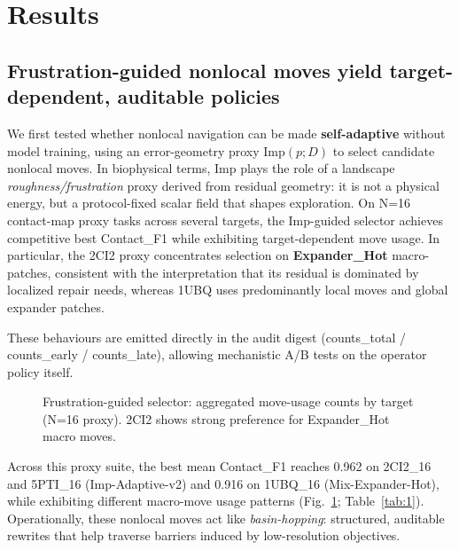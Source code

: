\section{Results}

\subsection{Frustration-guided nonlocal moves yield target-dependent, auditable policies}

We first tested whether nonlocal navigation can be made \textbf{self-adaptive} without model training, using an error-geometry proxy $\mathrm{Imp}(p;D)$ to select candidate nonlocal moves. In biophysical terms, $\mathrm{Imp}$ plays the role of a landscape \emph{roughness/frustration} proxy derived from residual geometry: it is not a physical energy, but a protocol-fixed scalar field that shapes exploration. On N=16 contact-map proxy tasks across several targets, the $\mathrm{Imp}$-guided selector achieves competitive best Contact\_F1 while exhibiting target-dependent move usage. In particular, the 2CI2 proxy concentrates selection on \textbf{Expander\_Hot} macro-patches, consistent with the interpretation that its residual is dominated by localized repair needs, whereas 1UBQ uses predominantly local moves and global expander patches.

These behaviours are emitted directly in the audit digest (counts\_total / counts\_early / counts\_late), allowing mechanistic A/B tests on the operator policy itself.

\begin{figure}[t]
  \centering
  \caption{Frustration-guided selector: aggregated move-usage counts by target (N=16 proxy). 2CI2 shows strong preference for Expander\_Hot macro moves.}
  \label{fig:2}
\end{figure}

\begin{table}[t]
  \centering
\caption{Frustration-guided benchmarks (N=16 proxy): representative top-performing variants.}
  \label{tab:1}
\end{table}

Across this proxy suite, the best mean Contact\_F1 reaches 0.962 on 2CI2\_16 and 5PTI\_16 (Imp-Adaptive-v2) and 0.916 on 1UBQ\_16 (Mix-Expander-Hot), while exhibiting different macro-move usage patterns (Fig.~\ref{fig:2}; Table~\ref{tab:1}). Operationally, these nonlocal moves act like \emph{basin-hopping}: structured, auditable rewrites that help traverse barriers induced by low-resolution objectives.

